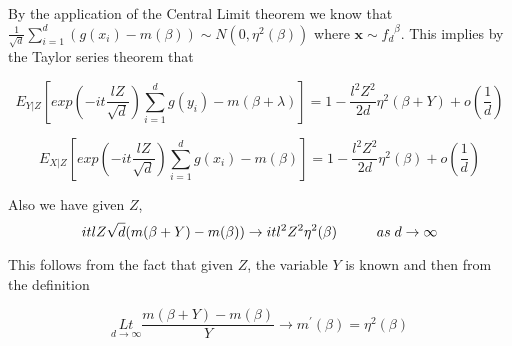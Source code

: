 \documentclass[11pt]{article}
\renewcommand{\b}{\ensuremath{\beta}}
\newcommand{\e}{\ensuremath{\epsilon}}
\renewcommand{\l}{\lambda}
\newcommand{\E}{\mathrm{E}}
\begin{document}
By the application of the Central Limit theorem we know that $\frac{1}{\sqrt{d}} \sum_{i=1}^{d} (g(x_{i})- m(\b))  \sim N(0, \eta^{2}(\b)) $ where $\textbf{x} \sim {f_d}^{\beta}$. This implies by the Taylor series theorem that 

\begin{equation} \label{eq:eqYZ}
E_{Y|Z} \left [ exp(-it \frac{lZ}{\sqrt{d}}) \sum_{i=1}^{d} {g(y_i) - m(\b+\l) } \right ] = 1-\frac{l^2 Z^2}{2d} \eta^2(\b+Y)+o \left (\frac{1}{d} \right) 
\end{equation}

%


\begin{equation}
\label{eq:eqXZ}
E_{X|Z} \left [ exp(-it \frac{lZ}{\sqrt{d}}) \sum_{i=1}^{d} {g(x_i) - m(\b) } \right ] = 1-\frac{l^2 Z^2}{2d} \eta^2(\b)+o \left (\frac{1}{d} \right)
\end{equation}

%

Also we have given $Z$,
\begin{equation} \label{eq:eqZ}
itlZ \sqrt{d} (m(\b+Y) -m(\b)) \rightarrow  it l^2 Z^2 \eta^2 (\b)   \hspace{1 cm} as \; d \rightarrow \infty
\end{equation}


This  follows from the fact that given $Z$, the variable $Y$ is known and then from the definition

\[ \underset{d \rightarrow \infty} {Lt} \frac{m(\b+Y) - m(\b)}{Y}  \rightarrow m^{'}(\b) = \eta^{2}(\b)  \]
\end{document}
